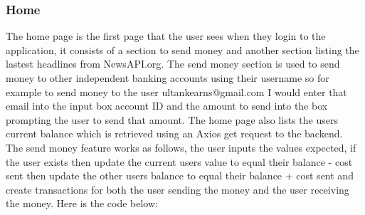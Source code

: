 \subsubsection{Home}
The home page is the first page that the user sees when they login to the application, it consists of a section to send money and another section listing the lastest headlines from NewsAPI.org.  The send money section is used to send money to other independent banking accounts using their username so for example to send money to the user ultankearns@gmail.com I would enter that email into the input box account ID and the amount to send into the box prompting the user to send that amount.  The home page also lists the users current balance which is retrieved using an Axios get request to the backend.
\\
The send money feature works as follows, the user inputs the values expected, if the user exists then update the current users value to equal their balance - cost sent then update the other users balance to equal their balance + cost sent and create transactions for both the user sending the money and the user receiving the money.  Here is the code below:
